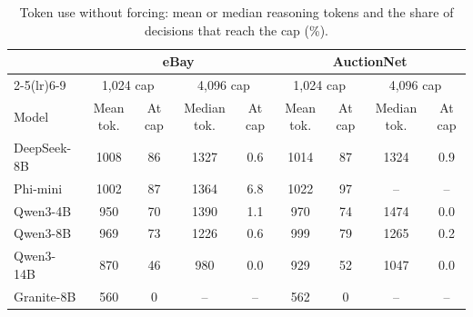 \begin{table}[h!]
\caption{Token use without forcing: mean or median reasoning tokens and the share of decisions that reach the cap (\%).}
\label{tab:unforced}
\footnotesize
\centering

\begin{tabular}{lcccccccc}
\toprule
& \multicolumn{4}{c}{eBay} & \multicolumn{4}{c}{AuctionNet} \\ \cmidrule(lr){2-5}\cmidrule(lr){6-9} & \multicolumn{2}{c}{1,024 cap} & \multicolumn{2}{c}{4,096 cap} & \multicolumn{2}{c}{1,024 cap} & \multicolumn{2}{c}{4,096 cap} \\ Model & Mean tok. & At cap & Median tok. & At cap & Mean tok. & At cap & Median tok. & At cap \\
\midrule
DeepSeek-8B & 1008 & 86 & 1327 & 0.6 & 1014 & 87 & 1324 & 0.9 \\
Phi-mini & 1002 & 87 & 1364 & 6.8 & 1022 & 97 & -- & -- \\
Qwen3-4B & 950 & 70 & 1390 & 1.1 & 970 & 74 & 1474 & 0.0 \\
Qwen3-8B & 969 & 73 & 1226 & 0.6 & 999 & 79 & 1265 & 0.2 \\
Qwen3-14B & 870 & 46 & 980 & 0.0 & 929 & 52 & 1047 & 0.0 \\
Granite-8B & 560 & 0 & -- & -- & 562 & 0 & -- & -- \\
\bottomrule
\end{tabular}
\end{table}
